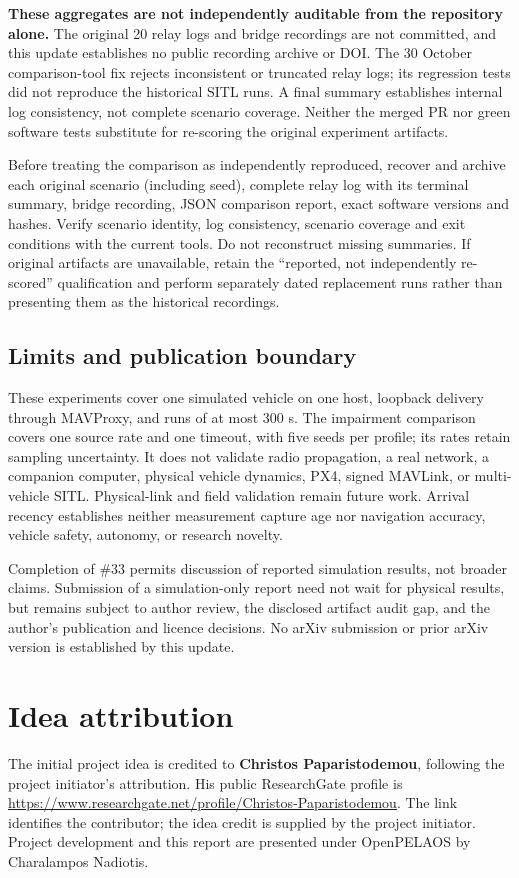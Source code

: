 \documentclass[11pt,a4paper]{article}
\begin{document}
\textbf{These aggregates are not independently auditable from the repository
alone.} The original 20 relay logs and bridge recordings are not committed,
and this update establishes no public recording archive or DOI. The
30 October comparison-tool fix rejects inconsistent or truncated relay
logs; its regression tests did not reproduce the historical SITL runs.
A final summary establishes internal log consistency, not complete scenario
coverage. Neither the merged PR nor green software tests substitute for
re-scoring the original experiment artifacts.

Before treating the comparison as independently reproduced, recover and
archive each original scenario (including seed), complete relay log with
its terminal summary, bridge recording, JSON comparison report, exact
software versions and hashes. Verify scenario identity, log consistency,
scenario coverage and exit conditions with the current tools. Do not
reconstruct missing summaries. If original artifacts are unavailable,
retain the ``reported, not independently re-scored'' qualification and
perform separately dated replacement runs rather than presenting them
as the historical recordings.

\subsection{Limits and publication boundary}
These experiments cover one simulated vehicle on one host, loopback delivery
through MAVProxy, and runs of at most 300 s. The impairment comparison covers
one source rate and one timeout, with five seeds per profile; its rates
retain sampling uncertainty. It does not validate radio propagation, a real
network, a companion computer, physical vehicle dynamics, PX4, signed
MAVLink, or multi-vehicle SITL. Physical-link and field validation remain
future work. Arrival recency establishes neither measurement capture age
nor navigation accuracy, vehicle safety, autonomy, or research novelty.

Completion of \#33 permits discussion of reported simulation results, not
broader claims. Submission of a simulation-only report need not wait for
physical results, but remains subject to author review, the disclosed
artifact audit gap, and the author's publication and licence decisions.
No arXiv submission or prior arXiv version is established by this update.

\section*{Idea attribution}
The initial project idea is credited to \textbf{Christos Paparistodemou}, following
the project initiator's attribution. His public ResearchGate profile is
\url{https://www.researchgate.net/profile/Christos-Paparistodemou}.
The link identifies the contributor; the idea credit is supplied by the project
initiator. Project development and this report are presented under OpenPELAOS
by Charalampos Nadiotis.
\end{document}
